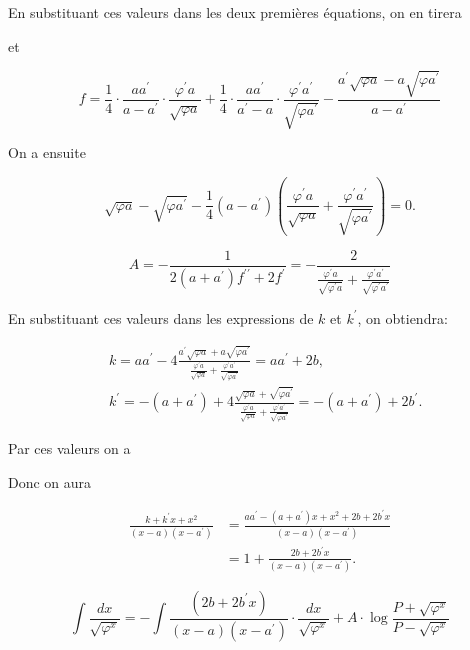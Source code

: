 \documentclass{article}
\begin{document}
En substituant ces valeurs dans les deux premières équations, on en tirera

et

\[
f=\frac{1}{4} \cdot \frac{a a^{\prime}}{a-a^{\prime}} \cdot \frac{\varphi^{\prime} a}{\sqrt{\varphi a}}+\frac{1}{4} \cdot \frac{a a^{\prime}}{a^{\prime}-a} \cdot \frac{\varphi^{\prime} a^{\prime}}{\sqrt{\varphi a^{\prime}}}-\frac{a^{\prime} \sqrt{\varphi a}-a \sqrt{\varphi a^{\prime}}}{a-a^{\prime}}
\]

On a ensuite

\[
\sqrt{\varphi a}-\sqrt{\varphi a^{\prime}}-\frac{1}{4}\left(a-a^{\prime}\right)\left(\frac{\varphi^{\prime} a}{\sqrt{\varphi a}}+\frac{\varphi^{\prime} a^{\prime}}{\sqrt{\varphi a^{\prime}}}\right)=0 .
\]

\[
A=-\frac{1}{2\left(a+a^{\prime}\right) f^{\prime \prime}+2 f^{\prime}}=-\frac{2}{\frac{\varphi^{\prime} a}{\sqrt{\varphi^{\prime} a}}+\frac{\varphi^{\prime} a^{\prime}}{\sqrt{\varphi^{\prime} a^{\prime}}}}
\]

En substituant ces valeurs dans les expressions de \(k\) et \(k^{\prime}\), on obtiendra:

\[
\begin{aligned}
& k=a a^{\prime}-4 \frac{a^{\prime} \sqrt{\varphi a}+a \sqrt{\varphi a^{\prime}}}{\frac{\varphi^{\prime} a}{\sqrt{\varphi a}}+\frac{\varphi^{\prime} a^{\prime}}{\sqrt{\varphi a^{\prime}}}}=a a^{\prime}+2 b, \\
& k^{\prime}=-\left(a+a^{\prime}\right)+4 \frac{\sqrt{\varphi a}+\sqrt{\varphi a^{\prime}}}{\frac{\varphi^{\prime} a}{\sqrt{\varphi a}}+\frac{\varphi^{\prime} a^{\prime}}{\sqrt{\varphi a^{\prime}}}}=-\left(a+a^{\prime}\right)+2 b^{\prime} .
\end{aligned}
\]

Par ces valeurs on a

Donc on aura

\[
\begin{aligned}
\frac{k+k^{\prime} x+x^{2}}{(x-a)\left(x-a^{\prime}\right)} & =\frac{a a^{\prime}-\left(a+a^{\prime}\right) x+x^{2}+2 b+2 b^{\prime} x}{(x-a)\left(x-a^{\prime}\right)} \\
& =1+\frac{2 b+2 b^{\prime} x}{(x-a)\left(x-a^{\prime}\right)} .
\end{aligned}
\]

\[
\int \frac{d x}{\sqrt{\varphi^{x}}}=-\int \frac{\left(2 b+2 b^{\prime} x\right)}{(x-a)\left(x-a^{\prime}\right)} \cdot \frac{d x}{\sqrt{\varphi^{x}}}+A \cdot \log \frac{P+\sqrt{\varphi^{x}}}{P-\sqrt{\varphi^{x}}}
\]
\end{document}
